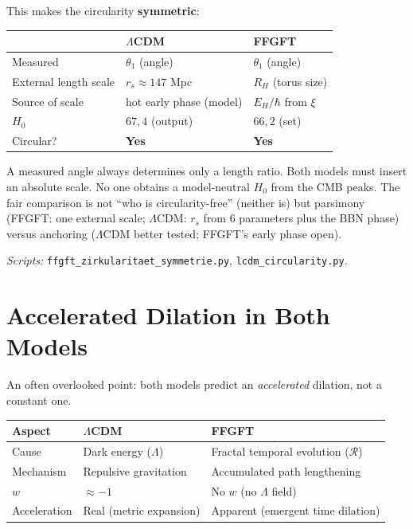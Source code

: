 This makes the circularity \textbf{symmetric}:

\begin{center}
\begin{tabular}{p{3.5cm}p{4cm}p{4cm}}
\toprule
 & \textbf{$\Lambda$CDM} & \textbf{FFGFT} \\
\midrule
Measured & $\theta_1$ (angle) & $\theta_1$ (angle) \\
External length scale & $r_s \approx 147$ Mpc & $R_H$ (torus size) \\
Source of scale & hot early phase (model) & $E_H/\hbar$ from $\xi$ \\
$H_0$ & $67{,}4$ (output) & $66{,}2$ (set) \\
Circular? & \textbf{Yes} & \textbf{Yes} \\
\bottomrule
\end{tabular}
\end{center}

A measured angle always determines only a length ratio. Both models must
insert an absolute scale. No one obtains a model-neutral $H_0$ from the CMB
peaks. The fair comparison is not ``who is circularity-free'' (neither is)
but parsimony (FFGFT: one external scale; $\Lambda$CDM: $r_s$ from 6
parameters plus the BBN phase) versus anchoring ($\Lambda$CDM better tested;
FFGFT's early phase open).

\emph{Scripts:} \texttt{ffgft\_zirkularitaet\_symmetrie.py},
\texttt{lcdm\_circularity.py}.

\section{Accelerated Dilation in Both Models}

An often overlooked point: both models predict an \emph{accelerated}
dilation, not a constant one.

\begin{center}
\begin{tabular}{p{3cm}p{5cm}p{5cm}}
\toprule
\textbf{Aspect} & \textbf{$\Lambda$CDM} & \textbf{FFGFT} \\
\midrule
Cause & Dark energy ($\Lambda$) & Fractal temporal evolution ($\mathcal{R}$) \\
Mechanism & Repulsive gravitation & Accumulated path lengthening \\
$w$ & $\approx -1$ & No $w$ (no $\Lambda$ field) \\
Acceleration & Real (metric expansion) & Apparent (emergent time dilation) \\
\bottomrule
\end{tabular}
\end{center}

